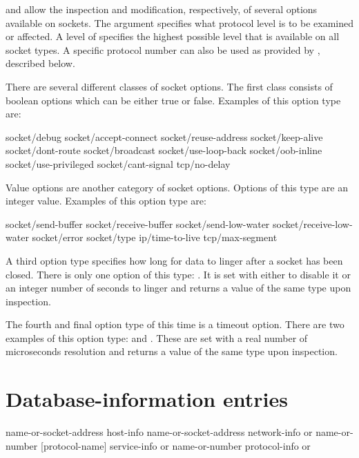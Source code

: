 \begin{desc}
 and  allow the inspection and
modification, respectively, of several options available on sockets. The
 argument specifies what protocol level is to be examined or
affected. A level of  specifies the highest possible
level that is available on all socket types. A specific protocol number
can also be used as provided by , described below.

There are several different classes of socket options. The first class
consists of boolean options which can be either true or false. Examples
of this option type are:
\begin{code}\codeallowbreaks
socket/debug
socket/accept-connect
socket/reuse-address
socket/keep-alive
socket/dont-route
socket/broadcast
socket/use-loop-back
socket/oob-inline
socket/use-privileged
socket/cant-signal
tcp/no-delay\end{code}

Value options are another category of socket options. Options of this
type are an integer value. Examples of this option type are:
\begin{code}\codeallowbreaks
socket/send-buffer
socket/receive-buffer
socket/send-low-water
socket/receive-low-water
socket/error
socket/type
ip/time-to-live
tcp/max-segment\end{code}

A third option type specifies how long for data to linger after a socket
has been closed. There is only one option of this type:
. It is set with either \sharpf to disable it or an
integer number of seconds to linger and returns a value of the same type
upon inspection.

The fourth and final option type of this time is a timeout option. There
are two examples of this option type:  and
. These are set with a real number of
microseconds resolution and returns a value of the same type upon
inspection.

\end{desc}

\section{Database-information entries}

 {name-or-socket-address} {host-info}
 {name-or-socket-address} {network-info or \sharpf}
 {name-or-number [protocol-name]} {service-info or \sharpf}
 {name-or-number} {protocol-info or \sharpf}

